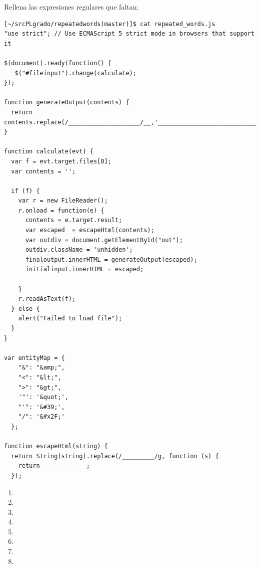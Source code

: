 Rellena las expresiones regulares que faltan:
\begin{verbatim}
[~/srcPLgrado/repeatedwords(master)]$ cat repeated_words.js 
"use strict"; // Use ECMAScript 5 strict mode in browsers that support it

$(document).ready(function() {
   $("#fileinput").change(calculate);
});

function generateOutput(contents) {
  return contents.replace(/____________________/__,'__________________________________');
}

function calculate(evt) {
  var f = evt.target.files[0]; 
  var contents = '';

  if (f) {
    var r = new FileReader();
    r.onload = function(e) { 
      contents = e.target.result;
      var escaped  = escapeHtml(contents);
      var outdiv = document.getElementById("out");
      outdiv.className = 'unhidden';
      finaloutput.innerHTML = generateOutput(escaped);
      initialinput.innerHTML = escaped;

    }
    r.readAsText(f);
  } else { 
    alert("Failed to load file");
  }
}

var entityMap = {
    "&": "&amp;",
    "<": "&lt;",
    ">": "&gt;",
    '"': '&quot;',
    "'": '&#39;',
    "/": '&#x2F;'
  };

function escapeHtml(string) {
  return String(string).replace(/_________/g, function (s) {
    return ____________;
  });
\end{verbatim}

\begin{enumerate}
\item 
{}
\item 
{}
\item 
{}
\item 
{}
\item 
{}
\item 
{}
\item 
{}
\item 
{}
\end{enumerate}

